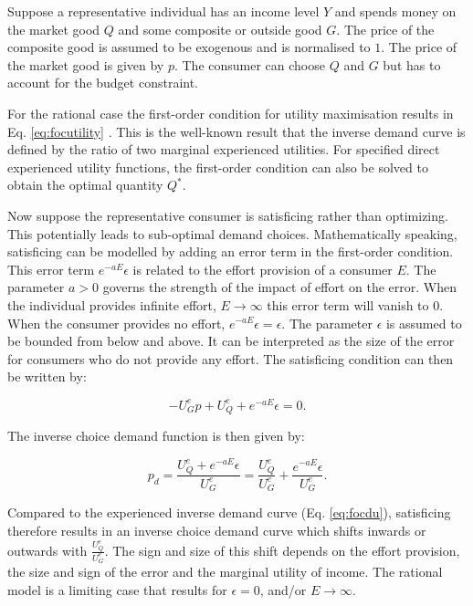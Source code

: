 \documentclass[
]{book}
\begin{document}
Suppose a representative individual has an income level \(Y\) and spends money on the market good \(Q\) and some composite or outside good \(G\). The price of the composite good is assumed to be exogenous and is normalised to \(1\). The price of the market good is given by \(p\). The consumer can choose \(Q\) and \(G\) but has to account for the budget constraint.

For the rational case the first-order condition for utility maximisation results in Eq. \eqref{eq:focutility} . This is the well-known result that the inverse demand curve is defined by the ratio of two marginal experienced utilities. For specified direct experienced utility functions, the first-order condition can also be solved to obtain the optimal quantity \(Q^*\).

Now suppose the representative consumer is satisficing rather than optimizing. This potentially leads to sub-optimal demand choices. Mathematically speaking, satisficing can be modelled by adding an error term in the first-order condition. This error term \(e^{-aE}\epsilon\) is related to the effort provision of a consumer \(E\). The parameter \(a>0\) governs the strength of the impact of effort on the error. When the individual provides infinite effort, \(E\rightarrow \infty\) this error term will vanish to \(0\). When the consumer provides no effort, \(e^{-aE}\epsilon=\epsilon\). The parameter \(\epsilon\) is assumed to be bounded from below and above. It can be interpreted as the size of the error for consumers who do not provide any effort. The satisficing condition can then be written by:

\begin{equation}
- U^e_G p + U^e_Q + e^{-aE}\epsilon = 0.
\end{equation}

The inverse choice demand function is then given by:

\begin{equation}
p_d = \frac{U_Q^e +  e^{-aE}\epsilon}{U_G^e} = \frac{U_Q^e}{U_G^e} + \frac{e^{-aE}\epsilon}{U_G^e}.
\end{equation}

Compared to the experienced inverse demand curve (Eq. \eqref{eq:focdu}), satisficing therefore results in an inverse choice demand curve which shifts inwards or outwards with \(\frac{U_Q^e}{U_G^e}\). The sign and size of this shift depends on the effort provision, the size and sign of the error and the marginal utility of income. The rational model is a limiting case that results for \(\epsilon =0\), and/or \(E \rightarrow \infty\).
\end{document}
